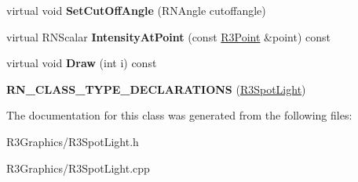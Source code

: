 \begin{DoxyCompactItemize}
\item 
virtual void {\bfseries Set\+Cut\+Off\+Angle} (R\+N\+Angle cutoffangle)\hypertarget{class_r3_spot_light_a7db2a49de305167b9132ec745967ccb8}{}\label{class_r3_spot_light_a7db2a49de305167b9132ec745967ccb8}

\item 
virtual R\+N\+Scalar {\bfseries Intensity\+At\+Point} (const \hyperlink{class_r3_point}{R3\+Point} \&point) const \hypertarget{class_r3_spot_light_a22392975bee5fdeb193740651e4e3a9f}{}\label{class_r3_spot_light_a22392975bee5fdeb193740651e4e3a9f}

\item 
virtual void {\bfseries Draw} (int i) const \hypertarget{class_r3_spot_light_a32227f8c75c9eb1aacf3895ff230a5f1}{}\label{class_r3_spot_light_a32227f8c75c9eb1aacf3895ff230a5f1}

\item 
{\bfseries R\+N\+\_\+\+C\+L\+A\+S\+S\+\_\+\+T\+Y\+P\+E\+\_\+\+D\+E\+C\+L\+A\+R\+A\+T\+I\+O\+NS} (\hyperlink{class_r3_spot_light}{R3\+Spot\+Light})\hypertarget{class_r3_spot_light_accba49bf23c8839b97f413a21e04014f}{}\label{class_r3_spot_light_accba49bf23c8839b97f413a21e04014f}

\end{DoxyCompactItemize}


The documentation for this class was generated from the following files\+:\begin{DoxyCompactItemize}
\item 
R3\+Graphics/R3\+Spot\+Light.\+h\item 
R3\+Graphics/R3\+Spot\+Light.\+cpp\end{DoxyCompactItemize}
